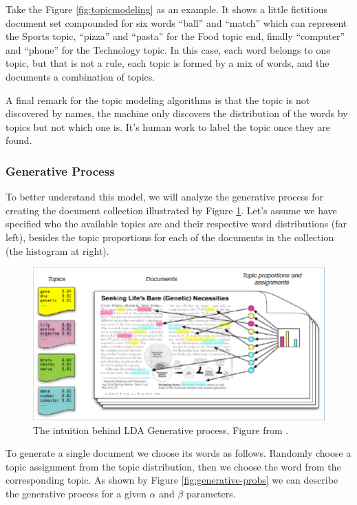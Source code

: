 	Take the Figure \ref{fig:topicmodeling} as an example. It shows a little fictitious document set compounded for six words ``ball'' and ``match'' which can represent the Sports topic, ``pizza'' and ``pasta'' for the Food topic end, finally ``computer'' and ``phone'' for the Technology  topic. In this case, each word belongs to one topic, but that is not a rule, each topic is formed by a mix of words, and the documents a combination of topics.
		
	A final remark for the topic modeling algorithms is that the topic is not discovered by names, the machine only discovers the distribution of the words by topics but not which one is. It's human work to label the topic once they are found.
	
	\subsubsection{Generative Process}
	
	To better understand this model, we will analyze the generative process for creating the document collection illustrated by Figure \ref{fig:lda-generative-process}. Let's assume we have specified who the available topics are and their respective word distributions (far left), besides the topic proportions for each of the documents in the collection (the histogram at right). 
		
	\begin{figure}[h!]
		\centering
		\includegraphics[width=\linewidth]{01.Chapters/02.Background/The-intuition-behind-LDA-Generative-process-by-D-Blei-17}
		\caption{The intuition behind LDA Generative process, Figure from  \cite{blei2012probabilistic}.}
		\label{fig:lda-generative-process}
	\end{figure}
	
	To generate a single document we choose its words as follows. Randomly choose a topic assignment from the topic distribution, then we choose the word from the corresponding topic. As shown by Figure \ref{fig:generative-probs} we can describe the generative process for a given $\alpha$ and $\beta$ parameters.
	
